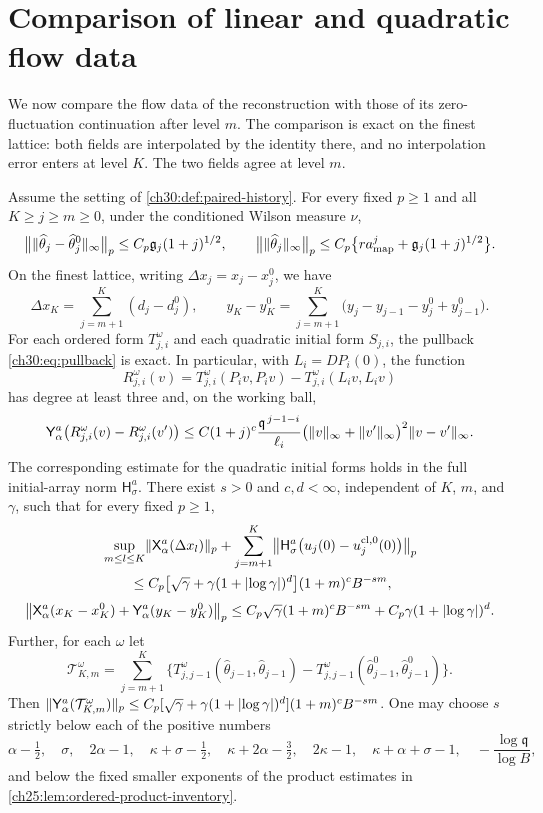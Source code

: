 \section{Comparison of linear and quadratic flow data}\label{ch30:sec:paired}

We now compare the flow data of the reconstruction with those of its zero-fluctuation continuation after level $m$. The comparison is exact on the finest lattice: both fields are interpolated by the identity there, and no interpolation error enters at level $K$. The two fields agree at level $m$.

\begin{theorem}\label{ch30:thm:paired-enhancement-return}
Assume the setting of \cref{ch30:def:paired-history}. For every fixed $p\ge1$ and all $K\ge j\ge m\ge0$, under the conditioned Wilson measure $\nu$,
\[
 \bigl\lVert\lVert \widehat\theta_j-\widehat\theta_j^0\rVert_\infty\bigr\rVert_p\le C_p\mathfrak g_j(1+j)^{1/2},\qquad
 \bigl\lVert\lVert \widehat\theta_j\rVert_\infty\bigr\rVert_p\le C_p\bigl\{ra_{\mathrm{map}}^j+\mathfrak g_j(1+j)^{1/2}\bigr\}.
\]
On the finest lattice, writing $\Delta x_j=x_j-x_j^0$, we have
\[
 \Delta x_K=\sum_{j=m+1}^K(d_j-d_j^0),\qquad
 y_K-y_K^0=\sum_{j=m+1}^K\bigl(y_j-y_{j-1}-y_j^0+y_{j-1}^0\bigr).
\]
For each ordered form $T^\omega_{j,i}$ and each quadratic initial form $S_{j,i}$, the pullback \eqref{ch30:eq:pullback} is exact. In particular, with $L_i=DP_i(0)$, the function
\[
 R^\omega_{j,i}(v)=T^\omega_{j,i}(P_iv,P_iv)-T^\omega_{j,i}(L_iv,L_iv)
\]
has degree at least three and, on the working ball,
\[
 \mathsf Y_\alpha^a\bigl(R^\omega_{j,i}(v)-R^\omega_{j,i}(v')\bigr)\le C(1+j)^c\frac{\mathfrak q^{\,j-1-i}}{\ell_i}\bigl(\lVert v\rVert_\infty+\lVert v'\rVert_\infty\bigr)^2\lVert v-v'\rVert_\infty .
\]
The corresponding estimate for the quadratic initial forms holds in the full initial-array norm $\mathsf H_\sigma^a$. There exist $s>0$ and $c,d<\infty$, independent of $K$, $m$, and $\gamma$, such that for every fixed $p\ge1$,
\[
 \begin{split}
 &\sup_{m\le l\le K}\lVert \mathsf X_\alpha^a(\Delta x_l)\rVert_p+\sum_{j=m+1}^K\bigl\lVert\mathsf H_\sigma^a\bigl(u_j(0)-u_j^{\mathrm{cl},0}(0)\bigr)\bigr\rVert_p\\
 &\qquad\le C_p\bigl[\sqrt\gamma+\gamma(1+\lvert \log\gamma\rvert)^d\bigr](1+m)^cB^{-sm},
 \end{split}
\]
\[
 \bigl\lVert\mathsf X_\alpha^a(x_K-x_K^0)+\mathsf Y_\alpha^a(y_K-y_K^0)\bigr\rVert_p\le C_p\sqrt\gamma(1+m)^cB^{-sm}+C_p\gamma(1+\lvert \log\gamma\rvert)^d .
\]
Further, for each $\omega$ let
\[
 \mathcal T^\omega_{K,m}=\sum_{j=m+1}^K\bigl\{T^\omega_{j,j-1}(\widehat\theta_{j-1},\widehat\theta_{j-1})-T^\omega_{j,j-1}(\widehat\theta^0_{j-1},\widehat\theta^0_{j-1})\bigr\}.
\]
Then $\lVert \mathsf Y_\alpha^a(\mathcal T^\omega_{K,m})\rVert_p\le C_p[\sqrt\gamma+\gamma(1+\lvert \log\gamma\rvert)^d](1+m)^cB^{-sm}$. One may choose $s$ strictly below each of the positive numbers
\[
 \alpha-\tfrac12,\quad\sigma,\quad2\alpha-1,\quad\kappa+\sigma-\tfrac12,\quad\kappa+2\alpha-\tfrac32,\quad2\kappa-1,\quad\kappa+\alpha+\sigma-1,\quad-\frac{\log\mathfrak q}{\log B},
\]
and below the fixed smaller exponents of the product estimates in \cref{ch25:lem:ordered-product-inventory}.
\end{theorem}



